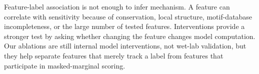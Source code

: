  Feature-label association is not enough to infer mechanism. A feature can correlate with \dms sensitivity because of conservation, local structure, motif-database incompleteness, or the large number of tested features. Interventions provide a stronger test by asking whether changing the feature changes model computation. Our ablations are still internal model interventions, not wet-lab validation, but they help separate features that merely track a label from features that participate in \esm masked-marginal scoring.
